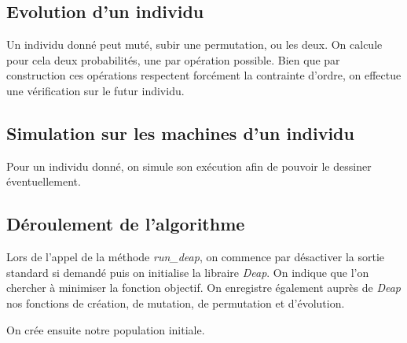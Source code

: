 \newpage

\subsection{Evolution d'un individu}



Un individu donné peut muté, subir une permutation, ou les deux. On calcule pour cela deux probabilités, une par opération possible. Bien que par construction ces opérations respectent forcément la contrainte d'ordre, on effectue une vérification sur le futur individu.

\subsection{Simulation sur les machines d'un individu}



Pour un individu donné, on simule son exécution afin de pouvoir le dessiner éventuellement.

\subsection{Déroulement de l'algorithme}



Lors de l'appel de la méthode \textit{run\_deap}, on commence par désactiver la sortie standard si demandé puis on initialise la libraire \textit{Deap}. On indique que l'on chercher à minimiser la fonction objectif. On enregistre également auprès de \textit{Deap} nos fonctions de création, de mutation, de permutation et d'évolution.



On crée ensuite notre population initiale.

